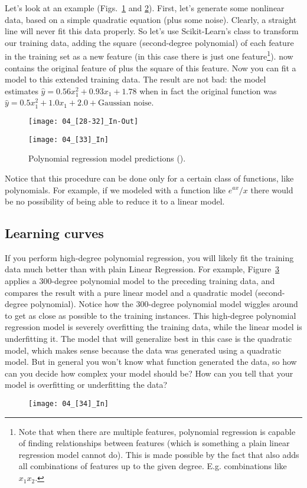 Let's look at an example (Figs.~\ref{04_[28-32]_In-Out} and \ref{04_[33]_In}). First, let's generate some nonlinear data, based on a simple quadratic equation (plus some noise). Clearly, a straight line will never fit this data properly. So let's use Scikit-Learn's  class to transform our training data, adding the square (second-degree polynomial) of each feature in the training set as a new feature (in this case there is just one feature\footnote{Note that when there are multiple features, polynomial regression is capable of finding relationships between features (which is something a plain linear regression model cannot do). This is made possible by the fact that  also adds all combinations of features up to the given degree. E.g. combinations like $x_1x_2$.}).  now contains the original feature of  plus the square of this feature. Now you can fit a  model to this extended training data. The result are not bad: the model estimates $\widehat{y}=0.56x_1^2+0.93x_1+1.78$ when in fact the original function was $\widehat{y}=0.5x_1^2+1.0x_1+2.0+\text{Gaussian noise}$.
\begin{figure}[h!t]
\centering
\texttt{[image: 04\_[28-32]\_In-Out]}
\caption{}\label{04_[28-32]_In-Out}
\end{figure}
\begin{figure}[h!t]
\centering
\texttt{[image: 04\_[33]\_In]}
\caption{Polynomial regression model predictions ().}\label{04_[33]_In}
\end{figure}

Notice that this procedure can be done only for a certain class of functions, like polynomials. For example, if we modeled with a function like $e^{ax}/x$ there would be no possibility of being able to reduce it to a linear model.
\subsection{Learning curves}
If you perform high-degree polynomial regression, you will likely fit the training data much better than with plain Linear Regression. For example, Figure~\ref{04_[34]_In} applies a $300$-degree polynomial model to the preceding training data, and compares the result with a pure linear model and a quadratic model (second-degree polynomial). Notice how the 300-degree polynomial model wiggles around to get as close as possible to the training instances. This high-degree polynomial regression model is severely overfitting the training data, while the linear model is underfitting it. The model that will generalize best in this case is the quadratic model, which makes sense because the data was generated using a quadratic model. But in general you won't know what function generated the data, so how can you decide how complex your model should be? How can you tell that your model is overfitting or underfitting the data?
\begin{figure}[h!t]
\centering
\texttt{[image: 04\_[34]\_In]}
\caption{}\label{04_[34]_In}
\end{figure}

